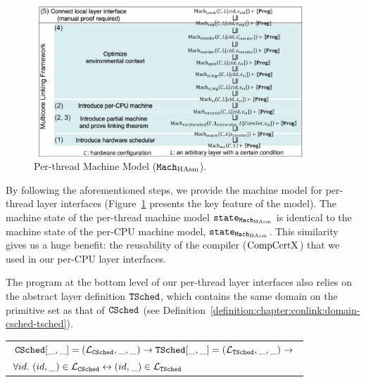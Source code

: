 \begin{figure}
\begin{center}
\includegraphics[width=0.9\textwidth, page=9]{figs/conlink/concurrent_linking}
\end{center}
\caption{Per-thread Machine Model (${\mathrm{\texttt{Mach}}}_{\mathrm{HAsm}}$).}
\label{fig:chapter:conlink:per-thread-machine-model}
\end{figure}

By following the aforementioned steps, we provide the machine model for per-thread layer interfaces (Figure~\ref{fig:chapter:conlink:per-thread-machine-model} presents the key feature of the model). 
The machine state of the per-thread machine model ${\mathrm{\texttt{state}}}_{{\mathrm{\texttt{Mach}}}_{\mathrm{HAsm}}}$ is identical
 to the machine state of the per-CPU machine model, ${\mathrm{\texttt{state}}}_{{\mathrm{\texttt{Mach}}}_{\mathrm{HAsm}}}$.
This similarity gives us a huge benefit: the reusability of the compiler ($\mathrm{CompCertX}$) 
that we  used in our per-CPU layer interfaces. 

The program at the bottom level of our per-thread layer interfaces also relies on the abstract layer definition ${{\mathrm{\texttt{TSched}}}}$, which contains the same domain on the primitive set as that of ${{\mathrm{\texttt{CSched}}}}$ (see Definition~\ref{definition:chapter:conlink:domain-csched-tsched}).

\begin{definition}
\label{definition:chapter:conlink:domain-csched-tsched}
\begin{tabular}{P{0.95\textwidth}}
${{\mathrm{\texttt{CSched}}}}[\_, \_] = (\mathcal{L}_{{{\mathrm{\texttt{CSched}}}}}, \_ , \_) \rightarrow {{\mathrm{\texttt{TSched}}}}[\_, \_] = (\mathcal{L}_{{{\mathrm{\texttt{TSched}}}}}, \_ , \_) \rightarrow$\\
$\forall id.\ (id, \_) \in \Layer_{\CSched}  \leftrightarrow (id, \_) \in \Layer_{\TSched} $\\
\end{tabular}
\end{definition}

